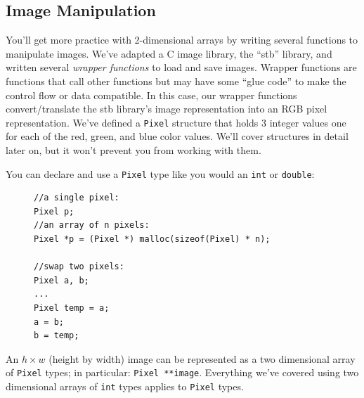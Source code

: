 \documentclass[12pt]{scrartcl}
\begin{document}
\subsection*{Image Manipulation}

You'll get more practice with 2-dimensional arrays by writing several
functions to manipulate images.  We've adapted a C image library, the 
``stb'' library, and written several \emph{wrapper functions} to load
and save images.  Wrapper functions are functions that call other
functions but may have some ``glue code'' to make the control flow or
data compatible.  In this case, our wrapper functions convert/translate
the stb library's image representation into an RGB pixel representation.
We've defined a \texttt{Pixel} structure that holds 3 integer
values one for each of the red, green, and blue color values.  We'll
cover structures in detail later on, but it won't prevent you from working
with them.  

You can declare and use a \texttt{Pixel} type like you would 
an \texttt{int} or \texttt{double}: 

\begin{figure}[H]
\begin{verbatim}
//a single pixel:
Pixel p;
//an array of n pixels:
Pixel *p = (Pixel *) malloc(sizeof(Pixel) * n);

//swap two pixels:
Pixel a, b;
...
Pixel temp = a;
a = b;
b = temp;
\end{verbatim} 
\end{figure}

An $h \times w$ (height by width) image can be represented as a two dimensional
array of \texttt{Pixel} types; in particular: \texttt{Pixel **image}.
Everything we've covered using two dimensional arrays of \texttt{int} types
applies to \texttt{Pixel} types.
\end{document}
